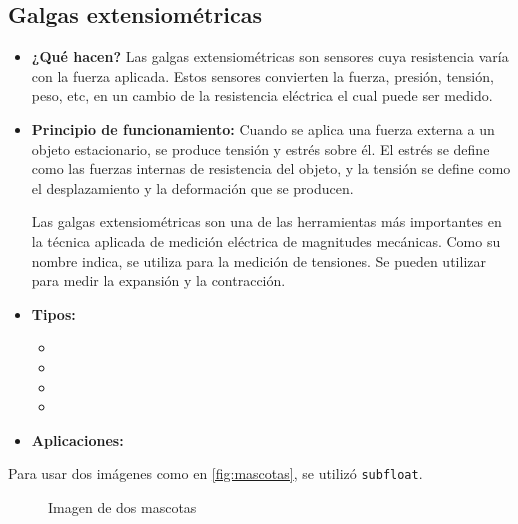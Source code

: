 \subsection*{Galgas extensiométricas}
\begin{itemize}
	\item \textbf{¿Qué hacen?} Las galgas extensiométricas son sensores cuya resistencia varía con la fuerza aplicada. Estos sensores convierten la fuerza, presión, tensión, peso, etc, en un cambio de la resistencia eléctrica el cual puede ser medido.
	\item \textbf{Principio de funcionamiento:} Cuando se aplica una fuerza externa a un objeto estacionario, se produce tensión y estrés sobre él. El estrés se define como las fuerzas internas de resistencia del objeto, y la tensión se define como el desplazamiento y la deformación que se producen.
	
	Las galgas extensiométricas son una de las herramientas más importantes en la técnica aplicada de medición eléctrica de magnitudes mecánicas. Como su nombre indica, se utiliza para la medición de tensiones. Se pueden utilizar para medir la expansión y la contracción.
	\item \textbf{Tipos:}
	\begin{itemize}
		\item \text{} 
		\item \text{} 
		\item \text{} 
		\item \text{}
	\end{itemize}
	
	\item \textbf{Aplicaciones:} 
\end{itemize}

Para usar dos imágenes como en \autoref{fig:mascotas}, se utilizó \texttt{subfloat}.
\begin{figure}[h]
	\centering
	\hfill
	\caption{Imagen de dos mascotas}
	\label{fig:mascotas}
\end{figure}